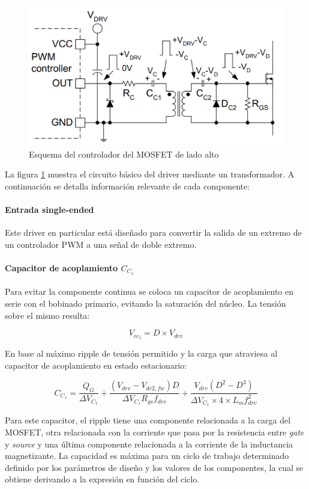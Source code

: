 \begin{figure}[H]
    \centering
    \includegraphics[width=\textwidth]{images/esquema_driver.png}
    \caption{Esquema del controlador del MOSFET de lado alto}
    \label{fig:driver}
\end{figure}

La figura \ref{fig:driver} muestra el circuito básico del driver mediante un transformador.
A continuación se detalla información relevante de cada componente: 

\paragraph{Entrada single-ended} 

Este driver en particular está diseñado para convertir la salida de un extremo de un controlador PWM a una señal de doble extremo. %

\paragraph{Capacitor de acoplamiento $C_{C_1}$}

Para evitar la componente continua se coloca un capacitor de acoplamiento en serie con el bobinado primario, 
evitando la saturación del núcleo. La tensión sobre el mismo resulta: 

$$ V_{cc_1}=D\times V_{drv} $$

En base al máximo ripple de tensión permitido y la carga que atraviesa al capacitor de acoplamiento en estado estacionario:

$$ C_{C_1}=\frac{Q_G}{\Delta V_{C_1}}+\frac{(V_{drv}-V_{dc2,fw})D}{\Delta V_{C_1}R_{gs}f_{drv}}+\frac{V_{drv}(D^2-D^3)}{\Delta V_{C_1}\times4\times L_mf_{drv}^2} $$

Para este capacitor, el ripple tiene una componente relacionada a la carga del MOSFET, 
otra relacionada con la corriente que pasa por la resistencia entre \textit{gate} y \textit{source} 
y una última componente relacionada a la corriente de la inductancia magnetizante. 
La capacidad es máxima para un ciclo de trabajo determinado definido por los parámetros de diseño 
y los valores de los componentes, la cual se obtiene derivando a la expresión en función del ciclo. 

